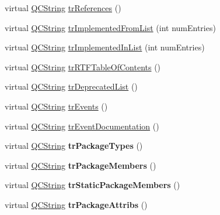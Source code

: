 \begin{DoxyCompactItemize}
\item 
virtual \mbox{\hyperlink{class_q_c_string}{Q\+C\+String}} \mbox{\hyperlink{class_translator_danish_aef4dbb56629664fccd583460f9193fe5}{tr\+References}} ()
\item 
virtual \mbox{\hyperlink{class_q_c_string}{Q\+C\+String}} \mbox{\hyperlink{class_translator_danish_a9d0bca8f89d36acc016338d4fec90df1}{tr\+Implemented\+From\+List}} (int num\+Entries)
\item 
virtual \mbox{\hyperlink{class_q_c_string}{Q\+C\+String}} \mbox{\hyperlink{class_translator_danish_a70fa6793d0817fea24f31df31aca2fa6}{tr\+Implemented\+In\+List}} (int num\+Entries)
\item 
virtual \mbox{\hyperlink{class_q_c_string}{Q\+C\+String}} \mbox{\hyperlink{class_translator_danish_aa9aaee102538d82916c34baedf0a08c9}{tr\+R\+T\+F\+Table\+Of\+Contents}} ()
\item 
virtual \mbox{\hyperlink{class_q_c_string}{Q\+C\+String}} \mbox{\hyperlink{class_translator_danish_ad1086a15d4d98a840d221df9422d7f12}{tr\+Deprecated\+List}} ()
\item 
virtual \mbox{\hyperlink{class_q_c_string}{Q\+C\+String}} \mbox{\hyperlink{class_translator_danish_adc3dc4dd23171bced014aafbd5593081}{tr\+Events}} ()
\item 
virtual \mbox{\hyperlink{class_q_c_string}{Q\+C\+String}} \mbox{\hyperlink{class_translator_danish_a2848147167e0fcc24a293ffa5ba63b34}{tr\+Event\+Documentation}} ()
\item 
\mbox{\label{class_translator_danish_a824552c3ba05d9074ad637ac48f6926f}} 
virtual \mbox{\hyperlink{class_q_c_string}{Q\+C\+String}} {\bfseries tr\+Package\+Types} ()
\item 
\mbox{\label{class_translator_danish_a0fb5728d0c6953d4fcc985cb2de03b37}} 
virtual \mbox{\hyperlink{class_q_c_string}{Q\+C\+String}} {\bfseries tr\+Package\+Members} ()
\item 
\mbox{\label{class_translator_danish_a73f8d76883895c79cbbff21d948b13e4}} 
virtual \mbox{\hyperlink{class_q_c_string}{Q\+C\+String}} {\bfseries tr\+Static\+Package\+Members} ()
\item 
\mbox{\label{class_translator_danish_aea2b801be4a160edd3b027ee3cc8a3bd}} 
virtual \mbox{\hyperlink{class_q_c_string}{Q\+C\+String}} {\bfseries tr\+Package\+Attribs} ()

\end{DoxyCompactItemize}
